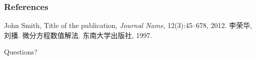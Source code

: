 \documentclass[notheorems,11pt]{beamer}
\makeatletter
\theoremstyle{plain}
\numberwithin{theorem}{section}
\numberwithin{definition}{section}
\numberwithin{lemma}{section}
\numberwithin{proposition}{section}
\numberwithin{corollary}{section}
\theoremstyle{example}
\numberwithin{figure}{section}
\numberwithin{table}{section}
\numberwithin{equation}{section}
\newcommand\HUGE{\@setfontsize\Huge{36}{42}}
\makeatother
\begin{document}

\begin{frame}
\frametitle{References}
\footnotesize{
\begin{thebibliography}{99} %
 John Smith, Title of the publication, \emph{Journal Name}, 12(3):45--678, 2012.
 李荣华, 刘播. 微分方程数值解法. 东南大学出版社, 1997.
\end{thebibliography}
}
\end{frame}





\begin{frame}[standout]
  Questions?
\end{frame}
\end{document}
